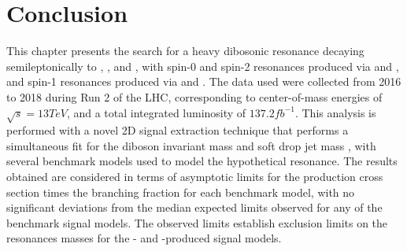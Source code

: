 
\section{Conclusion}
\label{sec:conclusion}

This chapter presents the search for a heavy dibosonic resonance decaying semileptonically to \WW, \WZ, and \WH, with spin-0 and spin-2 resonances produced via \ggF and \VBF, and spin-1 resonances produced via \DY and \VBF.
The data used were collected from 2016 to 2018 during Run 2 of the LHC, corresponding to center-of-mass energies of $\sqrt{s}=13\unit{TeV}$, and a total integrated luminosity of $137.2\unit{fb^{-1}}$.
This analysis is performed with a novel 2D signal extraction technique that performs a simultaneous fit for the diboson invariant mass \MVV and soft drop jet mass \MJ, with several benchmark models used to model the hypothetical resonance.
The results obtained are considered in terms of asymptotic limits for the production cross section times the branching fraction for each benchmark model, with no significant deviations from the median expected limits observed for any of the benchmark signal models.
The observed limits establish exclusion limits on the resonances masses for the \DY- and \ggF-produced signal models.
